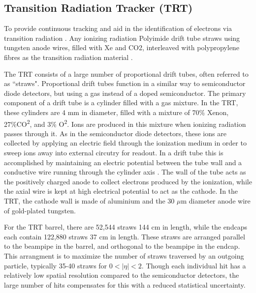     \subsection{Transition Radiation Tracker (TRT)} %
            To provide continuous tracking and aid in the identification of electrons via transition radiation \cite{ID_DTR}.
            Any ionizing radiation
            Polyimide drift tube straws using tungsten anode wires, filled with Xe and CO2, interleaved with polypropylene fibres as the transition radiation material \cite{atlas_tdr}.

            The TRT consists of a large number of proportional drift tubes, often referred to as ``straws".
            Proportional drift tubes function in a similar way to semiconductor diode detectors, but using a gas instead of a doped semiconductor.
            The primary component of a drift tube is a cylinder filled with a gas mixture.
            In the TRT, these cylinders are 4 mm in diameter, filled with a mixture of 70\% Xenon, 27\%CO\textsuperscript{2}, and 3\% O\textsuperscript{2}.
            Ions are produced in this mixture when ionizing radiation passes through it.
            As in the semiconductor diode detectors, these ions are collected by applying an electric field through the ionization medium in order to sweep ions away into external circutry for readout.
            In a drift tube this is accomplished by maintaining an electric potential between the tube wall and a conductive wire running through the cylinder axis \cite{drift_chambers}.  %
            The wall of the tube acts as the positively charged anode to collect electrons produced by the ionization, while the axial wire is kept at high electrical potential to act as the cathode.
            In the TRT, the cathode wall is made of aluminium and the 30 $\mu$m diameter anode wire of gold-plated tungsten. \cite{trt_design}

            For the TRT barrel, there are 52,544 straws 144 cm in length, while the endcaps each contain 122,880 straws 37 cm in length.
            These straws are arranged parallel to the beampipe in the barrel, and orthogonal to the beampipe in the endcap. %
            This arrangment is to maximize the number of straws traversed by an outgoing particle, typically 35-40 straws for $0 < |\eta| < 2$.
            Though each individual hit has a relatively low spatial resolution compared to the semiconductor detectors, the large number of hits compensates for this with a reduced statistical uncertainty.

